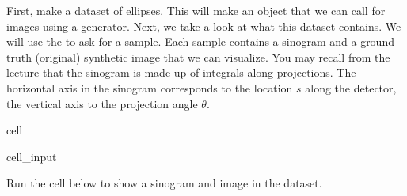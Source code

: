 \documentclass[letterpaper,10pt,english]{jupyterBook}
\begin{document}
\sphinxAtStartPar
First, make a dataset of ellipses. This will make an object that we can call for images using a generator. Next, we take a look at what this dataset contains. We will use the  to ask for a sample. Each sample contains a sinogram and a ground truth (original) synthetic image that we can visualize. You may recall from the lecture that the sinogram is made up of integrals along projections. The horizontal axis in the sinogram corresponds to the location \(s\) along the detector, the vertical axis to the projection angle \(\theta\).

\sphinxAtStartPar


\begin{sphinxuseclass}{cell}\begin{sphinxVerbatimInput}

\begin{sphinxuseclass}{cell_input}
\begin{sphinxVerbatim}[commandchars=\\\{\}]
 

   
  
\end{sphinxVerbatim}

\end{sphinxuseclass}\end{sphinxVerbatimInput}

\end{sphinxuseclass}
\sphinxAtStartPar
Run the cell below to show a sinogram and image in the dataset.
\end{document}
